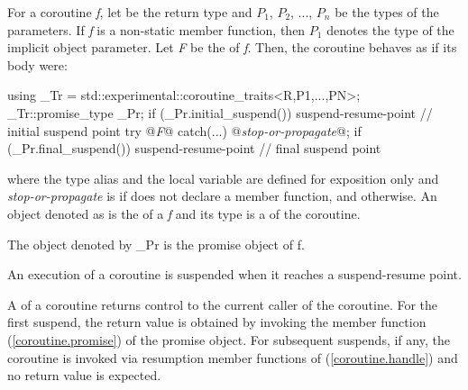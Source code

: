 \pnum
For a coroutine \textit{f}, let  be the return type and $P_1$, $P_2$, ..., $P_n$
be the types of the parameters. If \textit{f} is a non-static member function, then $P_1$ denotes the type of the implicit object parameter. 
Let \textit{F} be the 
of \textit{f}. Then, the coroutine 
behaves as if its body were:
\begin{codeblock}
  {
     using _Tr = std::experimental::coroutine_traits<R,P1,...,PN>;
     _Tr::promise_type _Pr;
     if (_Pr.initial_suspend()) {
       suspend-resume-point // initial suspend point
     }
     try { @\textit{F}@ }
     catch(...) {
       @\textit{stop-or-propagate}@;
     }
     if (_Pr.final_suspend()) {
       suspend-resume-point // final suspend point
     }
  }
\end{codeblock}
where the type alias  and the local variable  are 
defined for
exposition only and
\textit{stop-or-propagate} is  
if  does not declare a  member function, and  otherwise. An object denoted as  is the  of
a \textit{f} and its type is a 
of the coroutine.


The object denoted by _Pr is the promise object of f.

An execution of a coroutine is suspended when it reaches a suspend-resume point.

\pnum 
A  of a coroutine returns control to the current
caller of the coroutine. For the first suspend, the return value is obtained by invoking the member function 
 (\ref{coroutine.promise})
of the promise object.
\enternote
For subsequent suspends, if any, the coroutine
is invoked via resumption member functions of 
 (\ref{coroutine.handle}) and no return value is expected.
\exitnote

